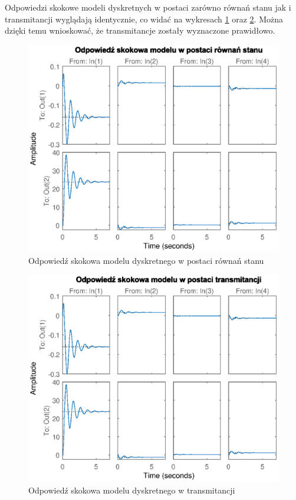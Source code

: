 Odpowiedzi skokowe modeli dyskretnych w postaci zarówno równań stanu jak i transmitancji wyglądają identycznie, co widać na wykresach \ref{fig:step_ss} oraz \ref{fig:step_tf}. Można dzięki temu wnioskować, że transmitancje zostały wyznaczone prawidłowo.

\begin{figure}
	\centering
	\includegraphics[width=.8\linewidth]{plot/step_space_state.eps}
	\caption{Odpowiedź skokowa modelu dyskretnego w postaci równań stanu}
	\label{fig:step_ss}
\end{figure}

\begin{figure}
	\centering
	\includegraphics[width=.8\linewidth]{plot/step_transfer.eps}
	\caption{Odpowiedź skokowa modelu dyskretnego w transmitancji}
	\label{fig:step_tf}
\end{figure}

\newpage
